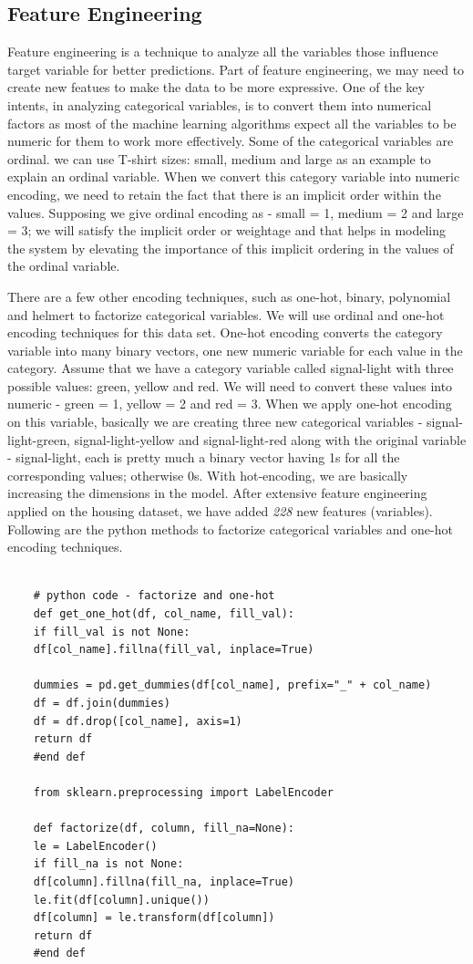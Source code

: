 \documentclass[sigconf]{acmart}
\begin{document}
	\subsection{Feature Engineering}
	
	Feature engineering is a technique to analyze all the variables those influence target variable for better predictions. Part of feature engineering, we may need to create new featues to make the data to be more expressive. One of the key intents, in analyzing categorical variables, is to convert them into numerical factors as most of the machine learning algorithms expect all the variables to be numeric for them to work more effectively. Some of the categorical variables are ordinal. we can use T-shirt sizes: small, medium and large as an example to explain an ordinal variable. When we convert this category variable into numeric encoding, we need to retain the fact that there is an implicit order within the values. Supposing we give ordinal encoding as - small = 1, medium = 2 and large = 3; we will satisfy the implicit order or weightage and that helps in modeling the system by elevating the importance of this implicit ordering in the values of the ordinal variable.
	
	There are a few other encoding techniques, such as one-hot, binary, polynomial and helmert to factorize categorical variables. We will use ordinal and one-hot encoding techniques for this data set. One-hot encoding converts the category variable into many binary vectors, one new numeric variable for each value in the category. Assume that we have a category variable called signal-light with three possible values: green, yellow and red. We will need to convert these values into numeric - green = 1, yellow = 2 and red = 3. When we apply one-hot encoding on this variable, basically we are creating three new categorical variables - signal-light-green, signal-light-yellow and signal-light-red along with the original variable - signal-light, each is pretty much a binary vector having 1s for all the corresponding values; otherwise 0s. With hot-encoding, we are basically increasing the dimensions in the model. After extensive feature engineering applied on the housing dataset, we have added {\em 228} new features (variables). Following are the python methods to factorize categorical variables and one-hot encoding techniques. 
	
	\begin{verbatim}
	
	# python code - factorize and one-hot
	def get_one_hot(df, col_name, fill_val):
	if fill_val is not None:
	df[col_name].fillna(fill_val, inplace=True)
	
	dummies = pd.get_dummies(df[col_name], prefix="_" + col_name)
	df = df.join(dummies)
	df = df.drop([col_name], axis=1)
	return df
	#end def
	
	from sklearn.preprocessing import LabelEncoder
	
	def factorize(df, column, fill_na=None):
	le = LabelEncoder()
	if fill_na is not None:
	df[column].fillna(fill_na, inplace=True)
	le.fit(df[column].unique())
	df[column] = le.transform(df[column])
	return df
	#end def
	\end{verbatim}
	
\end{document}
